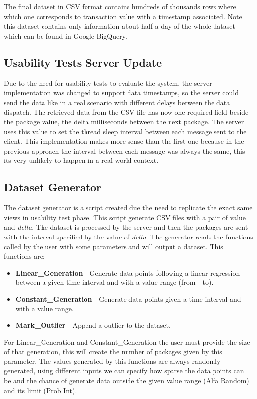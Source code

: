 \documentclass[letterpaper, 10 pt, conference]{ieeeconf}  %
\begin{document}
The final dataset in CSV format contains hundreds of thousands rows where which one corresponds to transaction value with a timestamp associated. Note this dataset contains only information about half a day of the whole dataset which can be found in Google BigQuery.

\subsection{Usability Tests Server Update}
\label{subsection:usabilityTests}
Due to the need for usability tests to evaluate the system, the server implementation was changed to support data timestamps, so the server could send the data like in a real scenario with different delays between the data dispatch. The retrieved data from the CSV file has now one required field beside the package value, the delta milliseconds between the next package. The server uses this value to set the thread sleep interval between each message sent to the client. This implementation makes more sense than the first one because in the previous approach the interval between each message was always the same, this its very unlikely to happen in a real world context.

\subsection{Dataset Generator}
\label{subsection:datasetGenerator}
The dataset generator is a script created due the need to replicate the exact same views in usability test phase. This script generate CSV files with a pair of value and \textit{delta}. The dataset is processed by the server and then the packages are sent with the interval specified by the value of \textit{delta}. The generator reads the functions called by the user with some parameters and will output a dataset. This functions are:
\begin{itemize}
    \item \textbf{Linear\_Generation} - Generate data points following a linear regression between a given time interval and with a value range (from - to).
    \item \textbf{Constant\_Generation} - Generate data points given a time interval and with a value range.
    \item \textbf{Mark\_Outlier} - Append a outlier to the dataset.
\end{itemize}
For Linear\_Generation and Constant\_Generation the user must provide the size of that generation, this will create the number of packages given by this parameter.\newline 
The values generated by this functions are always randomly generated, using different inputs we can specify how sparse the data points can be and the chance of generate data outside the given value range (Alfa Random) and its limit (Prob Int).
\end{document}
